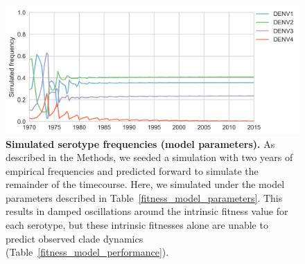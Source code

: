 \documentclass[11pt,oneside,letterpaper]{article}
\begin{document}
\begin{figure}[ht]
  \centering
  \includegraphics[width=\textwidth]{../figures/png/simulated_fitParameters_freqs.png}
  \caption{\textbf{Simulated serotype frequencies (model parameters).}
  As described in the Methods, we seeded a simulation with two years of empirical frequencies and predicted forward to simulate the remainder of the timecourse.
  Here, we simulated under the model parameters described in Table~\ref{fitness_model_parameters}.
  This results in damped oscillations around the intrinsic fitness value for each serotype, but these intrinsic fitnesses alone are unable to predict observed clade dynamics (Table~\ref{fitness_model_performance}).}
\label{simulated_frequencies_modelParameters}
\end{figure}
\end{document}
